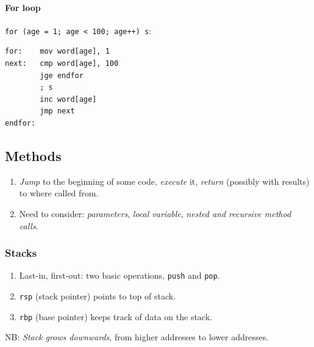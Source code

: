 \documentclass[twocolumn,english]{article}
\begin{document}
\paragraph{For loop}

\texttt{for (age = 1; age \textless{} 100; age++) s}:

\noindent 
\begin{lstlisting}[basicstyle={\footnotesize\ttfamily},frame=single]
for:    mov word[age], 1
next:   cmp word[age], 100
        jge endfor
        ; s
        inc word[age]
        jmp next
endfor: 
\end{lstlisting}



\subsection{Methods}
\begin{enumerate}
\item \emph{Jump} to the beginning of some code, \emph{execute} it, \emph{return}
(possibly with results) to where called from.
\item Need to consider: \emph{parameters}, \emph{local variable}, \emph{nested
and recursive method calls}.
\end{enumerate}

\subsubsection{Stacks}
\begin{enumerate}
\item Last-in, first-out: two basic operations, \texttt{push} and \texttt{pop}.
\item \texttt{rsp} (stack pointer) points to top of stack.
\item \texttt{rbp} (base pointer) keeps track of data on the stack.
\end{enumerate}
NB: \emph{Stack grows downwards}, from higher addresses to lower addresses.
\end{document}
